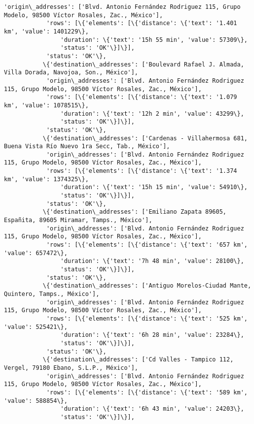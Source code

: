 \documentclass[11pt]{article}
\begin{document}
\begin{Verbatim}[commandchars=\\\{\}]
            'origin\_addresses': ['Blvd. Antonio Fernández Rodriguez 115, Grupo Modelo, 98500 Víctor Rosales, Zac., México'],
            'rows': [\{'elements': [\{'distance': \{'text': '1.401 km', 'value': 1401229\},
                'duration': \{'text': '15h 55 min', 'value': 57309\},
                'status': 'OK'\}]\}],
            'status': 'OK'\},
           \{'destination\_addresses': ['Boulevard Rafael J. Almada, Villa Dorada, Navojoa, Son., México'],
            'origin\_addresses': ['Blvd. Antonio Fernández Rodriguez 115, Grupo Modelo, 98500 Víctor Rosales, Zac., México'],
            'rows': [\{'elements': [\{'distance': \{'text': '1.079 km', 'value': 1078515\},
                'duration': \{'text': '12h 2 min', 'value': 43299\},
                'status': 'OK'\}]\}],
            'status': 'OK'\},
           \{'destination\_addresses': ['Cardenas - Villahermosa 681, Buena Vista Río Nuevo 1ra Secc, Tab., México'],
            'origin\_addresses': ['Blvd. Antonio Fernández Rodriguez 115, Grupo Modelo, 98500 Víctor Rosales, Zac., México'],
            'rows': [\{'elements': [\{'distance': \{'text': '1.374 km', 'value': 1374325\},
                'duration': \{'text': '15h 15 min', 'value': 54910\},
                'status': 'OK'\}]\}],
            'status': 'OK'\},
           \{'destination\_addresses': ['Emiliano Zapata 89605, Españita, 89605 Miramar, Tamps., México'],
            'origin\_addresses': ['Blvd. Antonio Fernández Rodriguez 115, Grupo Modelo, 98500 Víctor Rosales, Zac., México'],
            'rows': [\{'elements': [\{'distance': \{'text': '657 km', 'value': 657472\},
                'duration': \{'text': '7h 48 min', 'value': 28100\},
                'status': 'OK'\}]\}],
            'status': 'OK'\},
           \{'destination\_addresses': ['Antiguo Morelos-Ciudad Mante, Quintero, Tamps., México'],
            'origin\_addresses': ['Blvd. Antonio Fernández Rodriguez 115, Grupo Modelo, 98500 Víctor Rosales, Zac., México'],
            'rows': [\{'elements': [\{'distance': \{'text': '525 km', 'value': 525421\},
                'duration': \{'text': '6h 28 min', 'value': 23284\},
                'status': 'OK'\}]\}],
            'status': 'OK'\},
           \{'destination\_addresses': ['Cd Valles - Tampico 112, Vergel, 79180 Ebano, S.L.P., México'],
            'origin\_addresses': ['Blvd. Antonio Fernández Rodriguez 115, Grupo Modelo, 98500 Víctor Rosales, Zac., México'],
            'rows': [\{'elements': [\{'distance': \{'text': '589 km', 'value': 588854\},
                'duration': \{'text': '6h 43 min', 'value': 24203\},
                'status': 'OK'\}]\}],

\end{Verbatim}
\end{document}
